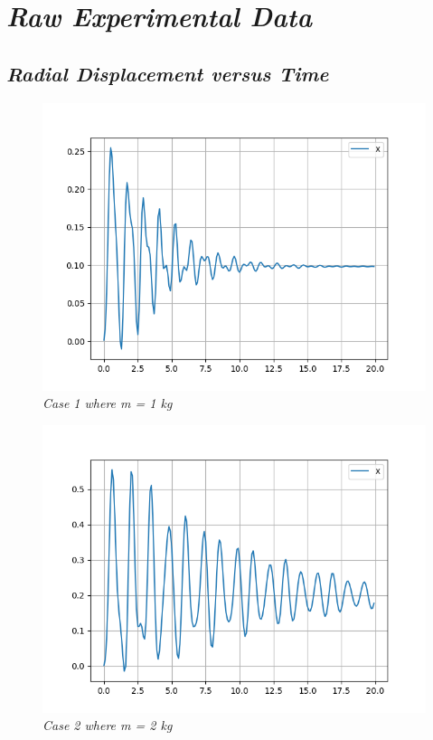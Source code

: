 \chapter{\textit{Raw Experimental Data}}\label{rawexp}
        
    \section{\textit{Radial Displacement versus Time}}
            
        \begin{figure}[H]
            \centering
            \includegraphics{Appendix/RExpPictures/R/rm1.png}
            \caption{\textit{Case 1 where m = 1 kg}}
            \label{}
        \end{figure}
            
        \begin{figure}[H]
            \centering
            \includegraphics{Appendix/RExpPictures/R/rm2.png}
            \caption{\textit{Case 2 where m = 2 kg}}
            \label{}
        \end{figure}
            
